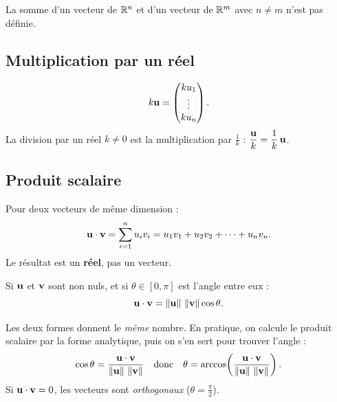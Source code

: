 \begin{importantbox}
La somme d'un vecteur de $\mathbb{R}^n$ et d'un vecteur de
$\mathbb{R}^m$ avec $n \neq m$ n'est pas définie.
\end{importantbox}

\subsection{Multiplication par un réel}

\begin{definition}
\[
    k \mathbf{u} =
    \begin{pmatrix} k u_1 \\ \vdots \\ k u_n \end{pmatrix}.
\]
La division par un réel $k \neq 0$ est la
multiplication par $\frac{1}{k}$ :
$\dfrac{\mathbf{u}}{k} = \dfrac{1}{k}\,\mathbf{u}$.
\end{definition}

\subsection{Produit scalaire}

\begin{definition}
Pour deux vecteurs de même dimension :
\[
    \mathbf{u} \cdot \mathbf{v} = \sum_{i=1}^{n} u_i v_i
    = u_1 v_1 + u_2 v_2 + \dots + u_n v_n.
\]
Le résultat est un \textbf{réel}, pas un vecteur.
\end{definition}

\begin{proposition}
Si $\mathbf{u}$ et $\mathbf{v}$ sont non nuls, et si
$\theta \in [0, \pi]$ est l'angle entre eux :
\[
    \mathbf{u} \cdot \mathbf{v}
    = \left\|\mathbf{u}\right\|\,\left\|\mathbf{v}\right\| \cos\theta.
\]
\end{proposition}

\begin{remark}
Les deux formes donnent le \emph{même} nombre. En
pratique, on calcule le produit scalaire par la forme
analytique, puis on s'en sert pour trouver l'angle :
\[
    \cos\theta =
    \frac{\mathbf{u} \cdot \mathbf{v}}{\left\|\mathbf{u}\right\|\,\left\|\mathbf{v}\right\|}
    \quad\text{donc}\quad
    \theta = \arccos\!\left(
    \frac{\mathbf{u} \cdot \mathbf{v}}{\left\|\mathbf{u}\right\|\,\left\|\mathbf{v}\right\|}
    \right).
\]
Si $\mathbf{u} \cdot \mathbf{v} = 0$, les vecteurs
sont \emph{orthogonaux} ($\theta = \frac{\pi}{2}$).
\end{remark}


